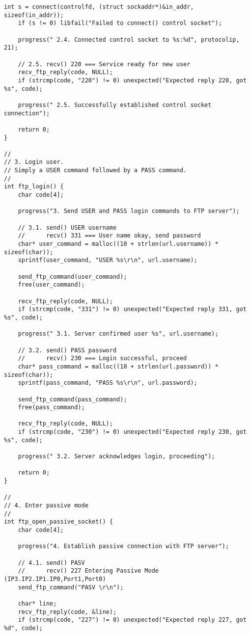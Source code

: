 \documentclass[subfiles]{main.tex}
\begin{document}
\begin{lstlisting}[style=C-sublime]
	int s = connect(controlfd, (struct sockaddr*)&in_addr, sizeof(in_addr));
	if (s != 0) libfail("Failed to connect() control socket");
	
	progress(" 2.4. Connected control socket to %s:%d", protocolip, 21);
	
	// 2.5. recv() 220 === Service ready for new user
	recv_ftp_reply(code, NULL);
	if (strcmp(code, "220") != 0) unexpected("Expected reply 220, got %s", code);
	
	progress(" 2.5. Successfully established control socket connection");
	
	return 0;
}

//
// 3. Login user.
// Simply a USER command followed by a PASS command.
//
int ftp_login() {
	char code[4];
	
	progress("3. Send USER and PASS login commands to FTP server");
	
	// 3.1. send() USER username
	//      recv() 331 === User name okay, send password
	char* user_command = malloc((10 + strlen(url.username)) * sizeof(char));
	sprintf(user_command, "USER %s\r\n", url.username);
	
	send_ftp_command(user_command);
	free(user_command);
	
	recv_ftp_reply(code, NULL);
	if (strcmp(code, "331") != 0) unexpected("Expected reply 331, got %s", code);
	
	progress(" 3.1. Server confirmed user %s", url.username);
	
	// 3.2. send() PASS password
	//      recv() 230 === Login successful, proceed
	char* pass_command = malloc((10 + strlen(url.password)) * sizeof(char));
	sprintf(pass_command, "PASS %s\r\n", url.password);
	
	send_ftp_command(pass_command);
	free(pass_command);
	
	recv_ftp_reply(code, NULL);
	if (strcmp(code, "230") != 0) unexpected("Expected reply 230, got %s", code);
	
	progress(" 3.2. Server acknowledges login, proceeding");
	
	return 0;
}

//
// 4. Enter passive mode
//
int ftp_open_passive_socket() {
	char code[4];
	
	progress("4. Establish passive connection with FTP server");
	
	// 4.1. send() PASV
	//      recv() 227 Entering Passive Mode (IP3.IP2.IP1.IP0,Port1,Port0)
	send_ftp_command("PASV \r\n");
	
	char* line;
	recv_ftp_reply(code, &line);
	if (strcmp(code, "227") != 0) unexpected("Expected reply 227, got %d", code);
	

\end{lstlisting}
\end{document}
